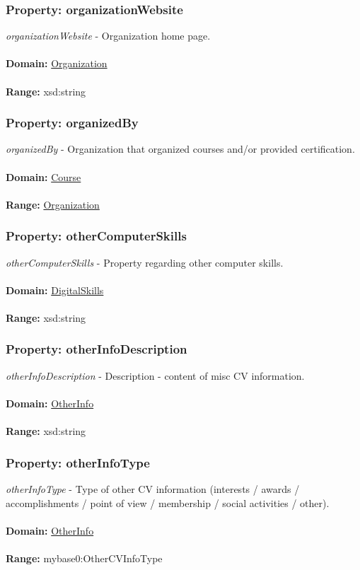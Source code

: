 \documentclass[a4paper,12pt]{article}
\numberwithin{equation}{section}
\begin{document}
\subsubsection{Property: organizationWebsite}\hypertarget{organizationWebsite}{}
\textit{organizationWebsite} - Organization home page.
\\\\
\textbf{Domain:} \hyperlink{Organization}{Organization} 
\\\\
\textbf{Range:}   xsd:string

\subsubsection{Property: organizedBy}\hypertarget{organizedBy}{}
\textit{organizedBy} - Organization that organized courses and/or provided certification.
\\\\
\textbf{Domain:} \hyperlink{Course}{Course} 
\\\\
\textbf{Range:}  \hyperlink{Organization}{Organization} 

\subsubsection{Property: otherComputerSkills}\hypertarget{otherComputerSkills}{}
\textit{otherComputerSkills} - Property regarding other computer skills.
\\\\
\textbf{Domain:} \hyperlink{DigitalSkills}{DigitalSkills} 
\\\\
\textbf{Range:}  xsd:string

\subsubsection{Property: otherInfoDescription}\hypertarget{otherInfoDescription}{}
\textit{otherInfoDescription} - Description - content of misc CV information.
\\\\
\textbf{Domain:} \hyperlink{OtherInfo}{OtherInfo} 
\\\\
\textbf{Range:}  xsd:string

\subsubsection{Property: otherInfoType}\hypertarget{otherInfoType}{}
\textit{otherInfoType} - Type of other CV information (interests / awards / accomplishments / point of view / membership / social activities / other).
\\\\
\textbf{Domain:} \hyperlink{OtherInfo}{OtherInfo} 
\\\\
\textbf{Range:}  mybase0:OtherCVInfoType
\end{document}
